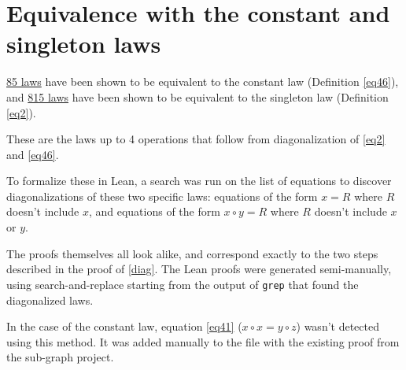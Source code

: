 \chapter{Equivalence with the constant and singleton laws}

\href{https://github.com/teorth/equational_theories/blob/main/equational_theories/Generated/Constant.lean}{85 laws}
have been shown to be equivalent to the constant law (Definition \ref{eq46}), and
\href{https://github.com/teorth/equational_theories/blob/main/equational_theories/Generated/Singleton.lean}{815 laws}
have been shown to be equivalent to the singleton law (Definition \ref{eq2}).

These are the laws up to 4 operations that follow from diagonalization of \ref{eq2} and \ref{eq46}.

To formalize these in Lean, a search was run on the list of equations to discover
diagonalizations of these two specific laws: equations of the form $x = R$ where $R$ doesn't include
$x$, and equations of the form $x \circ y = R$ where $R$ doesn't include $x$ or $y$.

The proofs themselves all look alike, and correspond exactly to the two steps described in the proof
of \ref{diag}. The Lean proofs were generated semi-manually, using search-and-replace starting from
the output of \texttt{grep} that found the diagonalized laws.

In the case of the constant law, equation \ref{eq41} ($x \circ x = y \circ z$) wasn't detected using
this method. It was added manually to the file with the existing proof from the sub-graph project.
